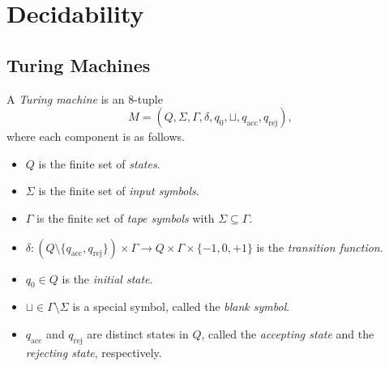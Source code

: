 \chapter{Decidability}
\section{Turing Machines}
\begin{definition}
  A \emph{Turing machine} is an 8-tuple
  \begin{equation*}
    M = (Q, \Sigma, \Gamma, \delta, q_0, \sqcup, q_\text{acc}, q_\text{rej}),
  \end{equation*}
  where each component is as follows.
  \begin{itemize}
    \item $Q$ is the finite set of \emph{states}.
    \item $\Sigma$ is the finite set of \emph{input symbols}.
    \item $\Gamma$ is the finite set of \emph{tape symbols} with
    $\Sigma \subseteq \Gamma$.
    \item $\delta : (Q \setminus \{q_\text{acc}, q_\text{rej}\}) \times \Gamma
    \to Q \times \Gamma \times \{-1, 0, +1\}$ is the
    \emph{transition function}.
    \item $q_0 \in Q$ is the \emph{initial state}.
    \item $\sqcup \in \Gamma \setminus \Sigma$ is a special symbol, called the
    \emph{blank symbol}.
    \item $q_\text{acc}$ and $q_\text{rej}$ are distinct states in $Q$,
    called the \emph{accepting state} and the \emph{rejecting state},
    respectively.
  \end{itemize}
\end{definition}

